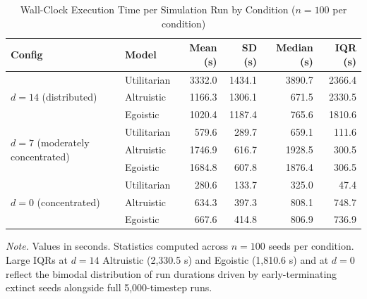 \documentclass{icsthesis}
\begin{document}
\begin{mainmatter}
		\begin{table}[H]
		\vspace{2ex}
		\centering
		\caption{Wall-Clock Execution Time per Simulation Run by Condition ($n = 100$ per condition)}
		\label{table:exec-time}
		\footnotesize
		\renewcommand{\arraystretch}{1.3}
		\begin{tabular}{l l r r r r}
		\hline\hline
		\textbf{Config} & \textbf{Model} & \textbf{Mean (s)} & \textbf{SD (s)} & \textbf{Median (s)} & \textbf{IQR (s)} \\
		\hline
		\multirow{3}{*}{$d = 14$ (distributed)}
		  & Utilitarian & 3332.0 & 1434.1 & 3890.7 & 2366.4 \\
		  & Altruistic  & 1166.3 & 1306.1 &  671.5 & 2330.5 \\
		  & Egoistic    & 1020.4 & 1187.4 &  765.6 & 1810.6 \\
		\hline
		\multirow{3}{*}{$d = 7$ (moderately concentrated)}
		  & Utilitarian &  579.6 & 289.7 &  659.1 & 111.6 \\
		  & Altruistic  & 1746.9 & 616.7 & 1928.5 & 300.5 \\
		  & Egoistic    & 1684.8 & 607.8 & 1876.4 & 306.5 \\
		\hline
		\multirow{3}{*}{$d = 0$ (concentrated)}
		  & Utilitarian &  280.6 & 133.7 &  325.0 &  47.4 \\
		  & Altruistic  &  634.3 & 397.3 &  808.1 & 748.7 \\
		  & Egoistic    &  667.6 & 414.8 &  806.9 & 736.9 \\
		\hline
		\end{tabular}
		\par\smallskip
		{\footnotesize\noindent\textit{Note.} Values in seconds. Statistics computed across $n = 100$ seeds per condition. Large IQRs at $d = 14$ Altruistic (2,330.5 s) and Egoistic (1,810.6 s) and at $d = 0$ reflect the bimodal distribution of run durations driven by early-terminating extinct seeds alongside full 5,000-timestep runs.}
		\end{table}


\end{mainmatter}
\end{document}
